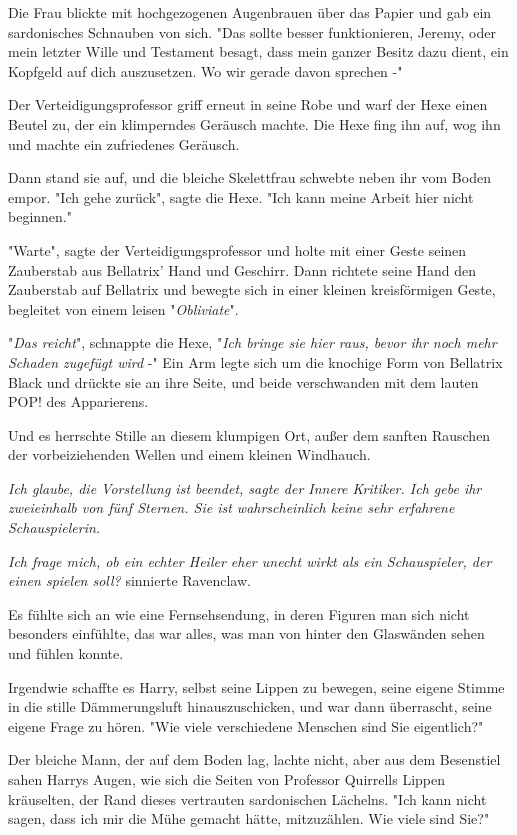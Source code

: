 {Die Frau blickte mit hochgezogenen Augenbrauen über das Papier und gab ein sardonisches Schnauben von sich. "Das sollte besser funktionieren, Jeremy, oder mein letzter Wille und Testament besagt, dass mein ganzer Besitz dazu dient, ein Kopfgeld auf dich auszusetzen. Wo wir gerade davon sprechen -"

Der Verteidigungsprofessor griff erneut in seine Robe und warf der Hexe einen Beutel zu, der ein klimperndes Geräusch machte. Die Hexe fing ihn auf, wog ihn und machte ein zufriedenes Geräusch.

Dann stand sie auf, und die bleiche Skelettfrau schwebte neben ihr vom Boden empor. "Ich gehe zurück", sagte die Hexe. "Ich kann meine Arbeit hier nicht beginnen."

"Warte", sagte der Verteidigungsprofessor und holte mit einer Geste seinen Zauberstab aus Bellatrix' Hand und Geschirr. Dann richtete seine Hand den Zauberstab auf Bellatrix und bewegte sich in einer kleinen kreisförmigen Geste, begleitet von einem leisen "\emph{Obliviate}".

"\emph{Das reicht}", schnappte die Hexe, "\emph{Ich bringe sie hier raus, bevor ihr noch mehr Schaden zugefügt wird} -" Ein Arm legte sich um die knochige Form von Bellatrix Black und drückte sie an ihre Seite, und beide verschwanden mit dem lauten POP! des Apparierens.

Und es herrschte Stille an diesem klumpigen Ort, außer dem sanften Rauschen der vorbeiziehenden Wellen und einem kleinen Windhauch.

\emph{\emph{Ich glaube, die Vorstellung ist beendet}, sagte der Innere Kritiker. I\emph{ch gebe ihr zweieinhalb von fünf Sternen. Sie ist wahrscheinlich keine sehr erfahrene Schauspielerin.}}

\emph{Ich frage mich, ob ein echter Heiler eher unecht wirkt als ein Schauspieler, der einen spielen soll?} sinnierte Ravenclaw.

Es fühlte sich an wie eine Fernsehsendung, in deren Figuren man sich nicht besonders einfühlte, das war alles, was man von hinter den Glaswänden sehen und fühlen konnte.

Irgendwie schaffte es Harry, selbst seine Lippen zu bewegen, seine eigene Stimme in die stille Dämmerungsluft hinauszuschicken, und war dann überrascht, seine eigene Frage zu hören. "Wie viele verschiedene Menschen sind Sie eigentlich?"

Der bleiche Mann, der auf dem Boden lag, lachte nicht, aber aus dem Besenstiel sahen Harrys Augen, wie sich die Seiten von Professor Quirrells Lippen kräuselten, der Rand dieses vertrauten sardonischen Lächelns. "Ich kann nicht sagen, dass ich mir die Mühe gemacht hätte, mitzuzählen. Wie viele sind Sie?"

}
